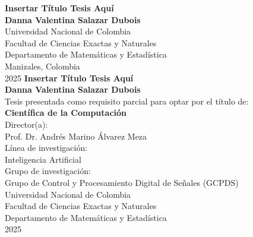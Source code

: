 \documentclass[12pt,enlgish,openany,twoside,letterpaper]{book}
\newcommand{\studentname}{}
\newcommand{\academictitle}{}
\newcommand{\resgroupone}{}
\newcommand{\researchtopic}{}
\newcommand{\thesisname}{}
\newcommand{\director}{}
\newcommand{\codirector}{}
\newcommand{\issuedate}{}
\newcommand{\sede}{}
\newcommand{\department}{}
\newcommand{\faculty}{}
\renewcommand{\studentname}{Danna Valentina Salazar Dubois}
\renewcommand{\thesisname}{Insertar Título Tesis Aquí}
\renewcommand{\issuedate}{2025}
\renewcommand{\director}{Prof. Dr. Andrés Marino Álvarez Meza}
\renewcommand{\academictitle}{Científica de la Computación}
\renewcommand{\resgroupone}{Grupo de Control y Procesamiento Digital de Señales (GCPDS) }
\renewcommand{\researchtopic}{Inteligencia Artificial}
\renewcommand{\sede}{Manizales}
\renewcommand{\department}{Departamento de Matemáticas y Estadística}
\renewcommand{\faculty}{Facultad de Ciencias Exactas y Naturales}
\begin{document}
{\newpage
\thispagestyle{empty}
\begin{center}
\begin{figure}
\centering
{}%
\end{figure}
\vspace{2.5cm}
\textbf{\Huge \thesisname} \\ 
\vspace{2.5cm}
\textbf{\Large \studentname} \\
\vspace{5.0cm}
\small Universidad Nacional de Colombia \\
\faculty \\
\department \\
\sede, Colombia\\
\issuedate
\newpage 
\thispagestyle{empty}
\vspace{2.5cm}
\textbf{\Huge \thesisname} \\
\vspace{2.5cm}
\textbf{\Large \studentname} \\
\vspace{2.5cm}
\small Tesis presentada como requisito parcial para optar por el título de: \\
{\bfseries \academictitle}\\
\vspace{2.5cm}
Director(a): \\
\director \\
\vspace{2.5cm}
Línea de investigación: \\ 
\researchtopic\\
Grupo de investigación: \\
\resgroupone \\
\vspace{2.0cm} 
Universidad Nacional de Colombia \\
\faculty \\
\department \\
\issuedate
\end{center}

}
\end{document}
